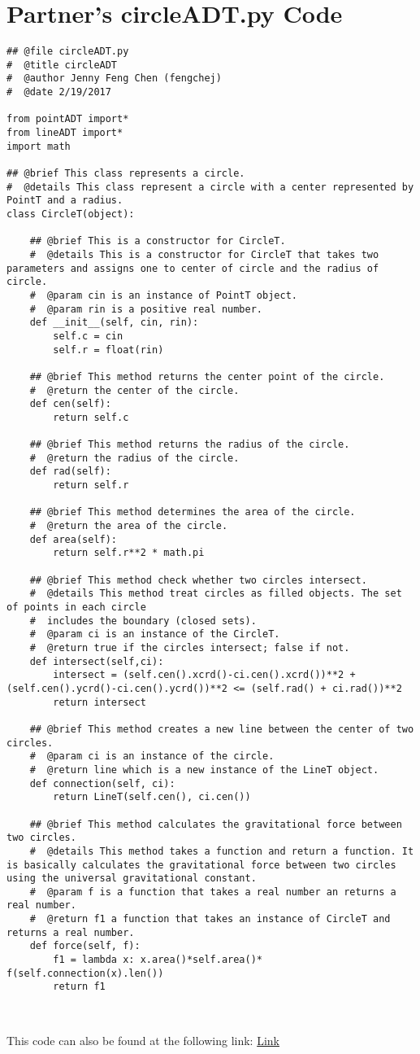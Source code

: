 \documentclass[12pt]{article}
\begin{document}
\section{Partner's circleADT.py Code} \label{PartnerCircleSect}
\begin{lstlisting}
## @file circleADT.py
#  @title circleADT
#  @author Jenny Feng Chen (fengchej)
#  @date 2/19/2017

from pointADT import*
from lineADT import*
import math

## @brief This class represents a circle.
#  @details This class represent a circle with a center represented by PointT and a radius.
class CircleT(object):

    ## @brief This is a constructor for CircleT.
    #  @details This is a constructor for CircleT that takes two parameters and assigns one to center of circle and the radius of circle.
    #  @param cin is an instance of PointT object.
    #  @param rin is a positive real number.
    def __init__(self, cin, rin):
        self.c = cin
        self.r = float(rin)

    ## @brief This method returns the center point of the circle.
    #  @return the center of the circle.
    def cen(self):
        return self.c
    
    ## @brief This method returns the radius of the circle.
    #  @return the radius of the circle.
    def rad(self):
        return self.r

    ## @brief This method determines the area of the circle.
    #  @return the area of the circle.
    def area(self):
        return self.r**2 * math.pi

    ## @brief This method check whether two circles intersect.
    #  @details This method treat circles as filled objects. The set of points in each circle
    #  includes the boundary (closed sets).
    #  @param ci is an instance of the CircleT.
    #  @return true if the circles intersect; false if not.
    def intersect(self,ci):
        intersect = (self.cen().xcrd()-ci.cen().xcrd())**2 + (self.cen().ycrd()-ci.cen().ycrd())**2 <= (self.rad() + ci.rad())**2
        return intersect

    ## @brief This method creates a new line between the center of two circles.
    #  @param ci is an instance of the circle.
    #  @return line which is a new instance of the LineT object.
    def connection(self, ci):
        return LineT(self.cen(), ci.cen())

    ## @brief This method calculates the gravitational force between two circles.
    #  @details This method takes a function and return a function. It is basically calculates the gravitational force between two circles using the universal gravitational constant.
    #  @param f is a function that takes a real number an returns a real number.
    #  @return f1 a function that takes an instance of CircleT and returns a real number.
    def force(self, f):    
        f1 = lambda x: x.area()*self.area()* f(self.connection(x).len())
        return f1
\end{lstlisting}

~\newline

\noindent This code can also be found at the following link:
\href{https://gitlab.cas.mcmaster.ca/se2aa4_cs2me3_assignments/patelm16/blob/master/A2/src/srcPartner/circleADT.py}{Link}
\end{document}
